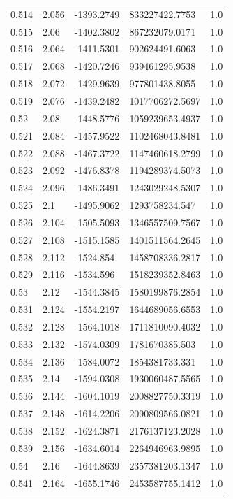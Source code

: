 \begin{tabular}{lllll}
0.514 & 2.056 & -1393.2749 & 833227422.7753 & 1.0 \\
0.515 & 2.06 & -1402.3802 & 867232079.0171 & 1.0 \\
0.516 & 2.064 & -1411.5301 & 902624491.6063 & 1.0 \\
0.517 & 2.068 & -1420.7246 & 939461295.9538 & 1.0 \\
0.518 & 2.072 & -1429.9639 & 977801438.8055 & 1.0 \\
0.519 & 2.076 & -1439.2482 & 1017706272.5697 & 1.0 \\
0.52 & 2.08 & -1448.5776 & 1059239653.4937 & 1.0 \\
0.521 & 2.084 & -1457.9522 & 1102468043.8481 & 1.0 \\
0.522 & 2.088 & -1467.3722 & 1147460618.2799 & 1.0 \\
0.523 & 2.092 & -1476.8378 & 1194289374.5073 & 1.0 \\
0.524 & 2.096 & -1486.3491 & 1243029248.5307 & 1.0 \\
0.525 & 2.1 & -1495.9062 & 1293758234.547 & 1.0 \\
0.526 & 2.104 & -1505.5093 & 1346557509.7567 & 1.0 \\
0.527 & 2.108 & -1515.1585 & 1401511564.2645 & 1.0 \\
0.528 & 2.112 & -1524.854 & 1458708336.2817 & 1.0 \\
0.529 & 2.116 & -1534.596 & 1518239352.8463 & 1.0 \\
0.53 & 2.12 & -1544.3845 & 1580199876.2854 & 1.0 \\
0.531 & 2.124 & -1554.2197 & 1644689056.6553 & 1.0 \\
0.532 & 2.128 & -1564.1018 & 1711810090.4032 & 1.0 \\
0.533 & 2.132 & -1574.0309 & 1781670385.503 & 1.0 \\
0.534 & 2.136 & -1584.0072 & 1854381733.331 & 1.0 \\
0.535 & 2.14 & -1594.0308 & 1930060487.5565 & 1.0 \\
0.536 & 2.144 & -1604.1019 & 2008827750.3319 & 1.0 \\
0.537 & 2.148 & -1614.2206 & 2090809566.0821 & 1.0 \\
0.538 & 2.152 & -1624.3871 & 2176137123.2028 & 1.0 \\
0.539 & 2.156 & -1634.6014 & 2264946963.9895 & 1.0 \\
0.54 & 2.16 & -1644.8639 & 2357381203.1347 & 1.0 \\
0.541 & 2.164 & -1655.1746 & 2453587755.1412 & 1.0 \\

\end{tabular}
